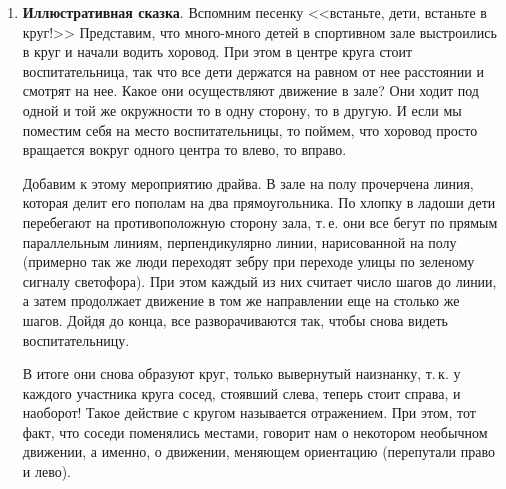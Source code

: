 \begin{enumerate}
\item \textbf{Иллюстративная сказка}. Вспомним песенку <<встаньте, дети, встаньте в круг!>> Представим, что много-много детей в спортивном зале выстроились в круг и начали водить хоровод. При этом в центре круга стоит воспитательница, так что все дети держатся на равном от нее расстоянии и смотрят на нее. Какое они осуществляют движение в зале? Они ходит под одной и той же окружности то в одну сторону, то в другую. И если мы поместим себя на место воспитательницы, то поймем, что хоровод просто вращается вокруг одного центра то влево, то вправо.

Добавим к этому мероприятию драйва. В зале на полу прочерчена линия, которая делит его пополам на два прямоугольника. По хлопку в ладоши дети перебегают на противоположную сторону зала, т.\,е. они все бегут по прямым параллельным линиям, перпендикулярно линии, нарисованной на полу (примерно так же люди переходят зебру при переходе улицы по зеленому сигналу светофора). При этом каждый из них считает число шагов до линии, а затем продолжает движение в том же направлении еще на столько же шагов. Дойдя до конца, все разворачиваются так, чтобы снова видеть воспитательницу.

В итоге они снова образуют круг, только вывернутый наизнанку, т.\,к. у каждого участника круга сосед, стоявший слева, теперь стоит справа, и наоборот! Такое действие с кругом называется отражением. При этом, тот факт, что соседи поменялись местами, говорит нам о некотором необычном движении, а именно, о движении, меняющем ориентацию (перепутали право и лево).


\end{enumerate}
